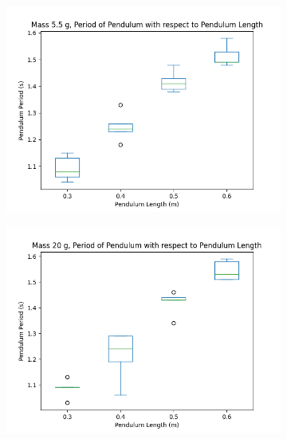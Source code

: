 \documentclass{article}
\begin{document}
\begin{figure}[ht!]
    \centering
    \begin{subfigure}{0.49\textwidth}
        \centering
        \includegraphics[width=\linewidth]{mass1.png}
        \label{fig:graph_m1}
    \end{subfigure}
    \hfil
    \begin{subfigure}{0.49\textwidth}
        \centering
        \includegraphics[width=\linewidth]{mass2.png}
        \label{fig:graph_m2}
    \end{subfigure}

    \vspace{1em}


\end{figure}
\end{document}
